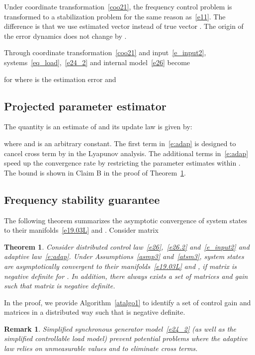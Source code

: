 \documentclass[journal]{IEEEtran}
\newtheorem{theorem}{\bf Theorem}[section]
\newtheorem{remark}{\bf Remark}[section]
\newcommand\oprocendsymbol{\hbox{}}
\newcommand\oprocend{\relax\ifmmode\else\unskip\hfill\fi\oprocendsymbol}
\begin{document}
Under coordinate transformation~\eqref{coo21}, the frequency control problem is transformed to a stabilization problem for the same reason as~\eqref{e11}. The difference is that we use estimated vector  instead of true vector .
The origin of the error dynamics does not change by .

Through coordinate transformation~\eqref{coo21} and input~\eqref{e_input2}, systems~\eqref{eq_load},~\eqref{e24_2} and internal model~\eqref{e26} become

for  where  is the estimation error
and



\subsection{Projected parameter estimator}\label{sec:adaptive2}
The quantity  is an estimate of  and its update law is given by:

where  and  is an arbitrary constant.
The first term  in~\eqref{e:adap} is designed to cancel cross term  by  in the Lyapunov analysis.
The additional terms in~\eqref{e:adap} speed up the convergence rate by restricting the parameter estimates within . The bound is shown in Claim B in the proof of Theorem~\ref{attheo2}.

\subsection{Frequency stability guarantee}\label{sec:stab2}
The following theorem summarizes the asymptotic convergence of system states  to their manifolds~\eqref{e19.03L} and .
Consider matrix


\begin{theorem}
Consider distributed control law~\eqref{e26},~\eqref{e26.2} and~\eqref{e_input2} and adaptive law~\eqref{e:adap}. Under Assumptions~\ref{asmp3} and~\ref{atsm3}, system states  are asymptotically convergent to their manifolds~\eqref{e19.03L} and , if matrix  is negative definite for .
In addition, there always exists a set of matrices  and gain  such that matrix  is negative definite.
\label{attheo2}
\end{theorem}

In the proof, we provide Algorithm~\ref{atalgo1} to identify a set of control gain and matrices in a distributed way such that  is negative definite.

\begin{remark}
Simplified synchronous generator model~\eqref{e24_2} (as well as the simplified controllable load model) prevent potential problems where the adaptive law relies on unmeasurable values  and  to eliminate cross terms.
\oprocend
\label{rem:sec5}
\end{remark}
\end{document}
